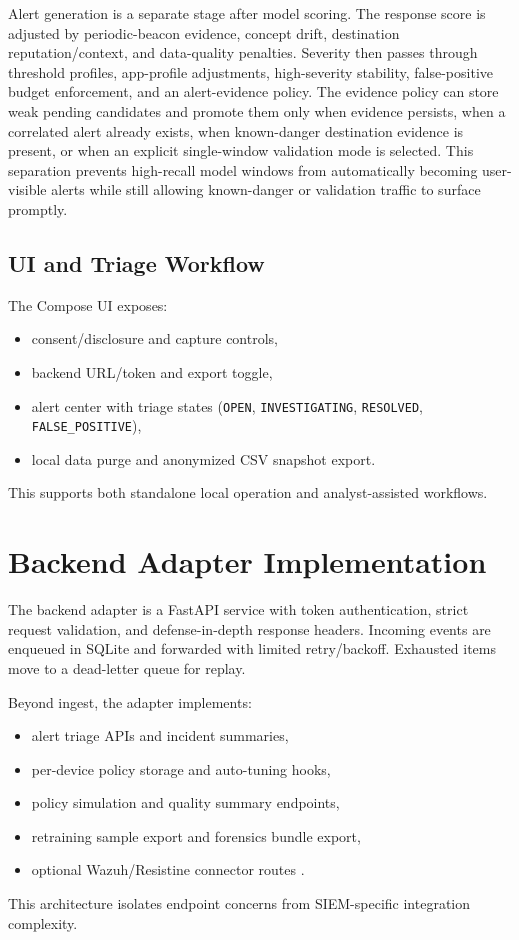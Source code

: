 Alert generation is a separate stage after model scoring. The response score is adjusted by
periodic-beacon evidence, concept drift, destination reputation/context, and data-quality penalties.
Severity then passes through threshold profiles, app-profile adjustments, high-severity stability,
false-positive budget enforcement, and an alert-evidence policy. The evidence policy can store weak
pending candidates and promote them only when evidence persists, when a correlated alert already
exists, when known-danger destination evidence is present, or when an explicit single-window
validation mode is selected. This separation prevents high-recall model windows from automatically
becoming user-visible alerts while still allowing known-danger or validation traffic to surface
promptly.

\subsection{UI and Triage Workflow}
The Compose UI exposes:
\begin{itemize}[leftmargin=*]
  \item consent/disclosure and capture controls,
  \item backend URL/token and export toggle,
  \item alert center with triage states (\texttt{OPEN}, \texttt{INVESTIGATING},
  \texttt{RESOLVED}, \texttt{FALSE\_POSITIVE}),
  \item local data purge and anonymized CSV snapshot export.
\end{itemize}
This supports both standalone local operation and analyst-assisted workflows.

\section{Backend Adapter Implementation}
The backend adapter is a FastAPI service with token authentication, strict request validation, and
defense-in-depth response headers. Incoming events are enqueued in SQLite and forwarded with
limited retry/backoff. Exhausted items move to a dead-letter queue for replay.

Beyond ingest, the adapter implements:
\begin{itemize}[leftmargin=*]
  \item alert triage APIs and incident summaries,
  \item per-device policy storage and auto-tuning hooks,
  \item policy simulation and quality summary endpoints,
  \item retraining sample export and forensics bundle export,
  \item optional Wazuh/Resistine connector routes \citep{wazuh_api}.
\end{itemize}
This architecture isolates endpoint concerns from SIEM-specific integration complexity.

